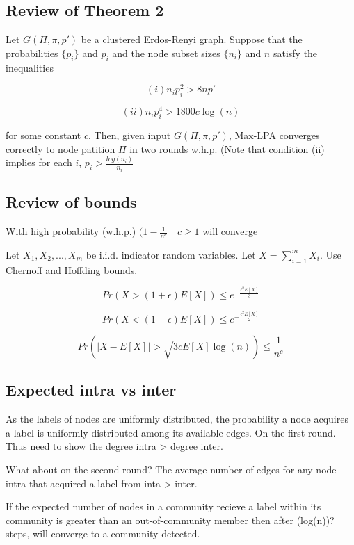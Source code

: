 \documentclass[11pt]{article}
\begin{document}
\subsection{Review of Theorem 2}
\label{sec:org1e103a8}

Let \(G(\Pi,\pi, p')\) be a clustered Erdos-Renyi graph. Suppose that the probabilities \(\{p_i\}\) and \(p_i\) and the node subset sizes \(\{n_i\}\) and \(n\) satisfy the inequalities

\[
 (i) n_i p_i^2 > 8np'
\]

\[
 (ii) n_i p_i^4 > 1800c \log(n)
\]

for some constant \(c\). Then, given input \(G(\Pi,\pi, p')\), Max-LPA converges correctly to node patition \(\Pi\) in two rounds w.h.p. (Note that condition (ii) implies for each \(i\), \(p_i > \frac{log(n_i)}{n_i}\)

\subsection{Review of bounds}
\label{sec:orgd4aec52}

With high probability (w.h.p.) \((1 - \frac{1}{n^c} \quad c \geq 1\) will converge

Let \(X_1, X_2, ..., X_m\) be i.i.d. indicator random variables. Let \(X = \sum_{i=1}^{m} {X_i}\). 
Use Chernoff and Hoffding bounds.

\[
Pr(X > (1 + \epsilon) E[X]) \leq e^{-\frac{\epsilon^2 E[X]}{3}}
\]

\[
Pr(X < (1 - \epsilon) E[X]) \leq e^{-\frac{\epsilon^2 E[X]}{2}}
\]

\[
Pr(\left| X - E[X] \right| > \sqrt{3cE[X]\log(n)}) \leq \frac{1}{n^c}
\]

\subsection{Expected intra vs inter}
\label{sec:org733ec93}

As the labels of nodes are uniformly distributed, the probability a node acquires a label is uniformly distributed among its 
available edges. On the first round. Thus need to show the degree intra > degree inter.

What about on the second round? The average number of edges for any node intra that acquired a label from inta > inter.

If the expected number of nodes in a community recieve a label within its community is greater
than an out-of-community member then after (log(n))? steps, will converge to a community detected.
\end{document}
